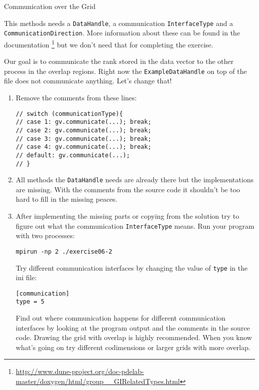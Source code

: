 \documentclass[12pt,a4paper]{article}
\begin{document}
\begin{Exercise}{Communication over the Grid}
\begin{itemize}
    This methods needs a \lstinline{DataHandle}, a communication
    \lstinline{InterfaceType} and a
    \lstinline{CommunicationDirection}. More information about these
    can be found in the documentation
    \footnote{\href{http://www.dune-project.org/doc-pdelab-master/doxygen/html/group\_\_GIRelatedTypes.html}{http://www.dune-project.org/doc-pdelab-master/doxygen/html/group\_\_GIRelatedTypes.html}}
    but we don't need that for completing the exercise.
  \end{itemize}
  Our goal is to communicate the rank stored in the data vector to the
  other process in the overlap regions. Right now the
  \lstinline{ExampleDataHandle} on top of the file does not
  communicate anything. Let's change that!

  \begin{enumerate}
  \item Remove the comments from these lines:
    \begin{lstlisting}
// switch (communicationType){
// case 1: gv.communicate(...); break;
// case 2: gv.communicate(...); break;
// case 3: gv.communicate(...); break;
// case 4: gv.communicate(...); break;
// default: gv.communicate(...);
// }
    \end{lstlisting}
  \item All methods the \lstinline{DataHandle} needs are already there
    but the implementations are missing.  With the comments from the
    source code it shouldn't be too hard to fill in the missing
    peaces.
  \item After implementing the missing parts or copying from the
    solution try to figure out what the communication
    \lstinline{InterfaceType} means. Run your program with two
    processes:
    \begin{lstlisting}
mpirun -np 2 ./exercise06-2
    \end{lstlisting}
    Try different communication interfaces by changing the value of
    \lstinline{type} in the ini file:
    \begin{lstlisting}
[communication]
type = 5
    \end{lstlisting}
    Find out where communication happens for different communication
    interfaces by looking at the program output and the comments in
    the source code. Drawing the grid with overlap is highly
    recommended. When you know what's going on try different
    codimensions or larger grids with more overlap.
  \end{enumerate}
\end{Exercise}
\end{document}
